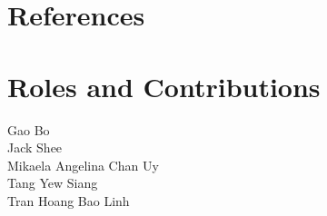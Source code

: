 \documentclass[a4paper]{article}
\theoremstyle{genius}
\begin{document}
\section{References}


\section{Roles and Contributions}

\begin{description}
\item [Gao Bo]
\item [Jack Shee]
\item [Mikaela Angelina Chan Uy] 
\item [Tang Yew Siang]
\item [Tran Hoang Bao Linh]
\end{description}
\end{document}
